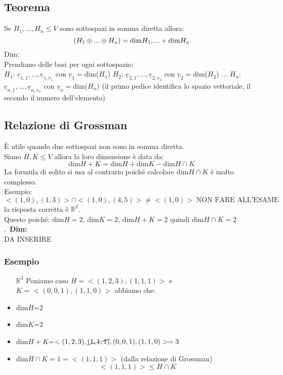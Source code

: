 \subsection{Teorema}
Se $H_1,...,H_n \le V$ sono sottospazi in somma diretta allora:
$$ \text(H_1 \oplus ... \oplus H_n) = \text{dim}H_1,...+\text{dim}H_n $$
Dim:\\
Prendiano delle basi per ogni sottospazio:\\
$H_1$: $\underline{e}_{1,1},...,\underline{e}_{1,v_1}$ con $\underline{v}_1=$dim($H_1$)
$H_2$: $\underline{e}_{2,1},...,\underline{e}_{2,v_2}$ con $\underline{v}_2=$dim($H_2$)
...
$H_n$: $\underline{e}_{n,1},...,\underline{e}_{n,v_n}$ con $\underline{v}_n=$dim($H_n$)
(il primo pedice identifica lo spazio vettoriale, il secondo il numero dell’elemento)\\


\subsection{Relazione di Grossman}
È utile quando due sottospazi non sono in somma diretta.\\
Siano $H,K \le V$ allora la loro dimensione è data da:
$$ \text{dim}H+K = \text{dim}H +\text{dim}K - \text{dim} H \cap K$$
La formula di solito si usa al contrario poiché calcolare $\text{dim} H \cap K$ è molto complesso.\\
Esempio:
$ <(1,0),(1,3)> \cap <(1,0),(4,5)> \neq <(1,0)> \; \text{NON FARE ALL'ESAME} $ la risposta corretta è $\mathbb{R}^2$.\\
Questo poiché: $\text{dim}H = 2$, $\text{dim}K = 2$, $\text{dim}H+K = 2$ quindi $\text{dim} H \cap K = 2$.\
\textbf{Dim:}\\
DA INSERIRE
\subsubsection{Esempio}
\begin{itemize}
\item[$\mathbb{R}^3$] Poniamo caso $H = <(1,2,3),(1,1,1)>$ e $K = <(0,0,1),(1,1,0)>$ abbiamo che:
	\item dim$H$=2
	\item dim$K$=2
	\item dim$H+K$=$<(1,2,3),\cancel{(1,1,1)},(0,0,1),(1,1,0)> = 3$
	\item dim$H \cap K = 1 = <(1,1,1)>$ (dalla relazione di Grossman)
	$$ <(1,1,1)> \le H \cap K $$
\end{itemize}



